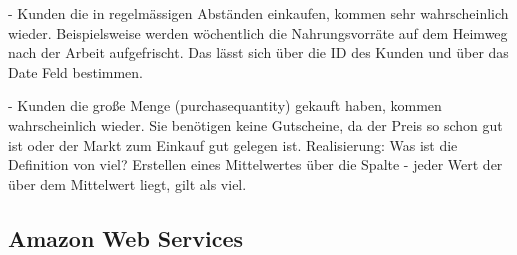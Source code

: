 		- Kunden die in regelmässigen Abständen einkaufen, kommen sehr wahrscheinlich wieder. Beispielsweise werden wöchentlich die Nahrungsvorräte auf dem Heimweg nach der Arbeit aufgefrischt. Das lässt sich über die ID des Kunden und über das Date Feld bestimmen.
		
		- Kunden die große Menge (purchasequantity) gekauft haben, kommen wahrscheinlich wieder. Sie benötigen keine Gutscheine, da der Preis so schon gut ist oder der Markt zum Einkauf gut gelegen ist. Realisierung: Was ist die Definition von viel? Erstellen eines Mittelwertes über die Spalte - jeder Wert der über dem Mittelwert liegt, gilt als viel.
	
\subsection{Amazon Web Services}

